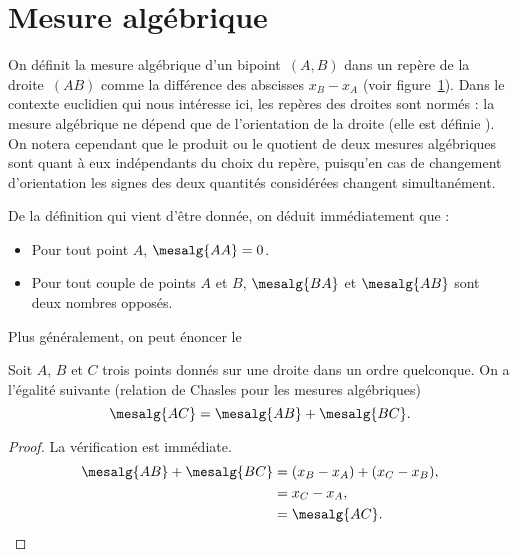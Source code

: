 
\section{Mesure algébrique}
On définit la mesure algébrique d'un bipoint~$(A,B)$ dans un repère de la droite~$(AB)$ comme la différence des abscisses $x_B-x_A$ (voir figure~\ref{figmesalg}). Dans le contexte euclidien qui nous intéresse ici, les repères des droites sont normés : la mesure algébrique ne dépend que de l'orientation de la droite (elle est définie ). On notera cependant  que le produit ou le quotient de deux mesures algébriques sont quant à eux indépendants du choix du repère, puisqu'en cas de changement d'orientation les signes des deux quantités considérées changent simultanément. 

\begin{figure}[ht]
\centering
{}
\figcaption{}\label{figmesalg}
\end{figure}

De la définition qui vient d'être donnée, on déduit immédiatement que :
\begin{itemize}
\item Pour tout point $A$, $\mesalg{AA}=0$.
\item Pour tout couple de points $A$ et $B$, $\mesalg{BA}$ et $\mesalg{AB}$ sont deux nombres opposés.
\end{itemize} 
Plus généralement, on peut énoncer le
\begin{thm}\label{thchasles}%
Soit $A$, $B$ et $C$ trois points donnés sur une droite dans un ordre quelconque. On a l'égalité suivante (relation de Chasles pour les mesures algébriques) 
\[\mesalg{AC}=\mesalg{AB}+\mesalg{BC}.\]
\end{thm}

\begin{proof} La vérification est immédiate.
\begin{align*}\mesalg{AB}+\mesalg{BC}&=(x_B-x_A)+(x_C-x_B),\\
&=x_C-x_A,\\
&=\mesalg{AC}.\qedhere
\end{align*}
\end{proof}

